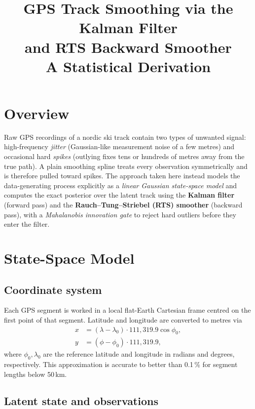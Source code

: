 \documentclass[11pt, a4paper]{article}
\title{\textbf{GPS Track Smoothing via the Kalman Filter\\and RTS Backward Smoother}\\[0.4em]
       \large A Statistical Derivation}
\author{}
\date{}
\theoremstyle{remark}
\begin{document}
\maketitle
\tableofcontents
\bigskip

\section{Overview}

Raw GPS recordings of a nordic ski track contain two types of unwanted
signal: high-frequency \emph{jitter} (Gaussian-like measurement noise of
a few metres) and occasional hard \emph{spikes} (outlying fixes tens or
hundreds of metres away from the true path).  A plain smoothing spline
treats every observation symmetrically and is therefore pulled toward
spikes.  The approach taken here instead models the data-generating
process explicitly as a \emph{linear Gaussian state-space model} and
computes the exact posterior over the latent track using the
\textbf{Kalman filter} (forward pass) and the \textbf{Rauch--Tung--Striebel
(RTS) smoother} (backward pass), with a \emph{Mahalanobis innovation gate}
to reject hard outliers before they enter the filter.

\section{State-Space Model}

\subsection{Coordinate system}

Each GPS segment is worked in a local flat-Earth Cartesian frame centred on
the first point of that segment.  Latitude and longitude are converted to
metres via
\begin{align}
  x &= (\lambda - \lambda_0)\cdot 111{,}319.9\cos\phi_0, \\
  y &= (\phi   - \phi_0)   \cdot 111{,}319.9,
\end{align}
where $\phi_0,\lambda_0$ are the reference latitude and longitude in
radians and degrees, respectively.  This approximation is accurate to
better than 0.1\,\% for segment lengths below 50\,km.

\subsection{Latent state and observations}
\end{document}
